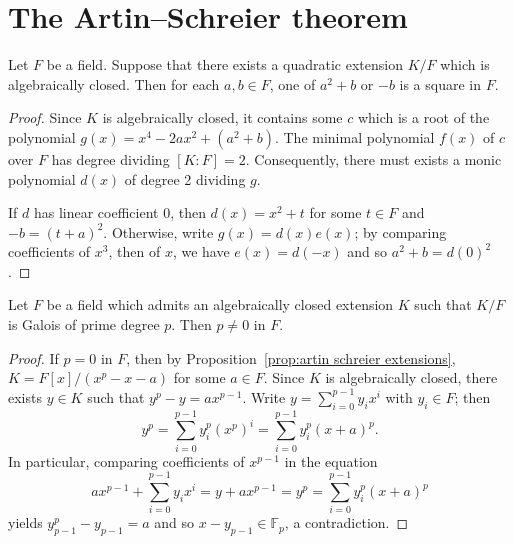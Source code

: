 \section{The Artin--Schreier theorem}

\begin{lemma} \label{lem:squares in quadratic closure}
\leanok
Let $F$ be a field.
Suppose that  there exists a quadratic extension $K/F$ which is algebraically closed.
Then for each $a,b \in F$, one of $a^2+b$ or $-b$ is a square in $F$.
\end{lemma}
\begin{proof}
\leanok
Since $K$ is algebraically closed, it contains some $c$ 
which is a root of the polynomial $g(x) = x^4 - 2ax^2 + (a^2+b)$.
The minimal polynomial $f(x)$ of $c$ over $F$ has degree dividing $[K:F] = 2$.
Consequently, there must exists a monic polynomial $d(x)$ of degree 2 dividing $g$.

If $d$ has linear coefficient 0, then $d(x) = x^2 + t$ for some $t \in F$ and 
$-b = (t+a)^2$. 
Otherwise, write $g(x) = d(x) e(x)$; by comparing coefficients of $x^3$,
then of $x$, we have $e(x) = d(-x)$ and so $a^2 + b = d(0)^2$.
\end{proof}


\begin{lemma} \label{lem:cyclic-p-nonzero}
\leanok
Let $F$ be a field which admits an algebraically closed extension $K$ such that $K/F$ is Galois of prime degree $p$. Then $p \neq 0$ in $F$.
\end{lemma}
\begin{proof}
\leanok
If $p=0$ in $F$, then by Proposition~\ref{prop:artin schreier extensions},
$K = F[x]/(x^p-x-a)$ for some $a \in F$. Since $K$ is algebraically closed,
there exists $y \in K$ such that $y^p-y=ax^{p-1}$. Write $y = \sum_{i=0}^{p-1} y_i x^i$ with $y_i \in F$; then 
\[
y^p = \sum_{i=0}^{p-1} y_i^p (x^p)^i = \sum_{i=0}^{p-1} y_i^p (x+a)^p.
\]
In particular, comparing coefficients of $x^{p-1}$ in the equation
\[
ax^{p-1} + \sum_{i=0}^{p-1} y_i x^i = y + ax^{p-1} = y^p = \sum_{i=0}^{p-1} y_i^p (x+a)^p
\]
yields $y_{p-1}^{p} - y_{p-1} = a$ and so $x-y_{p-1} \in \mathbb{F}_p$, a contradiction.
\end{proof}

